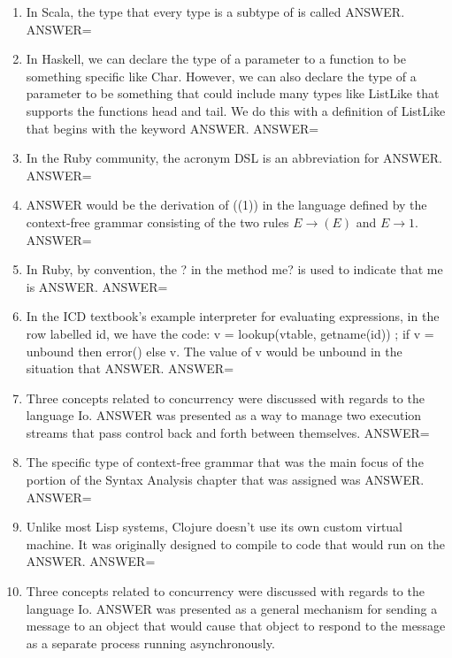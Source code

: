 \documentclass{exam}
\begin{document}
\begin{enumerate}
\item In Scala, the type that every type is a subtype of is called ANSWER.\newline
ANSWER=
\item In Haskell, we can declare the type of a parameter to a function to be something specific like Char.  However, we can also declare the type of a parameter to be something that could include many types like ListLike that supports the functions head and tail.  We do this with a definition of ListLike that begins with the keyword ANSWER.\newline
ANSWER=
\item In the Ruby community, the acronym DSL is an abbreviation for ANSWER.\newline
ANSWER=
\item ANSWER would be the derivation of ((1)) in the language defined by the context-free grammar consisting of the two rules $E \rightarrow ( E )$ and $E \rightarrow 1$.\newline
ANSWER=
\item In Ruby, by convention, the ? in the method me? is used to indicate that me is ANSWER.\newline
ANSWER=
\item In the ICD textbook's example interpreter for evaluating expressions, in the row labelled id, we have the code: v = lookup(vtable, getname(id)) ; if v = unbound then error() else v.  The value of v would be unbound in the situation that ANSWER.\newline
ANSWER=
\item Three concepts related to concurrency were discussed with regards to the language Io.  ANSWER was presented as a way to manage two execution streams that pass control back and forth between themselves.\newline
ANSWER=
\item The specific type of context-free grammar that was the main focus of the portion of the Syntax Analysis chapter that was assigned was ANSWER.\newline
ANSWER=
\item Unlike most Lisp systems, Clojure doesn't use its own custom virtual machine.  It was originally designed to compile to code that would run on the ANSWER.\newline
ANSWER=
\item Three concepts related to concurrency were discussed with regards to the language Io.  ANSWER was presented as a general mechanism for sending a message to an object that would cause that object to respond to the message as a separate process running asynchronously.\newline

\end{enumerate}
\end{document}
